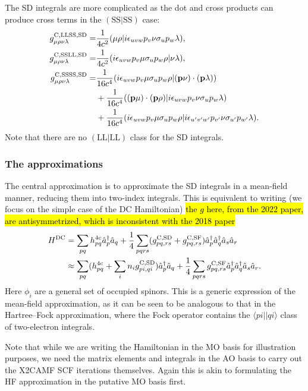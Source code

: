 \documentclass{article}
\begin{document}
The SD integrals are more complicated as the dot and cross products can produce cross terms in the $(\mathrm{SS}|\mathrm{SS})$ case:
\begin{align}
g^{\mathrm{C, LLSS, SD}}_{\mu\rho\nu\lambda}=&\frac{1}{4c^2}( \mu\rho|i\epsilon_{uvw}p_v\nu\sigma_up_w\lambda ),\label{eq:sd_ao_llss}\\
g^{\mathrm{C, SSLL, SD}}_{\mu\rho\nu\lambda}=&\frac{1}{4c^2}(i\epsilon_{uvw}p_v\mu\sigma_up_w\rho|\nu\lambda ),\label{eq:sd_ao_ssll}\\
g^{\mathrm{C, SSSS, SD}}_{\mu\rho\nu\lambda}=&\frac{1}{16c^4}(i\epsilon_{uvw}p_v\mu\sigma_up_w\rho|(\bm{\mathrm{p}}\nu)\cdot(\bm{\mathrm{p}}\lambda))\nonumber\\
&+\frac{1}{16c^4}((\bm{\mathrm{p}}\mu)\cdot(\bm{\mathrm{p}}\rho)|i\epsilon_{uvw}p_v\nu\sigma_up_w\lambda)\nonumber\\
&+\frac{1}{16c^4}(i\epsilon_{uvw}p_v\mu\sigma_up_w\rho|i\epsilon_{u'v'w'}p_{v'}\nu\sigma_{u'}p_{w'}\lambda).\label{eq:sd_ao_ssss}
\end{align}
Note that there are no $(\mathrm{LL}|\mathrm{LL})$ class for the SD integrals.

\subsubsection{The approximations}
The central approximation is to approximate the SD integrals in a mean-field manner, reducing them into two-index integrals. This is equivalent to writing (we focus on the simple case of the DC Hamiltonian) \hl{the $g$ here, from the 2022 paper, are antisymmetrized, which is inconsistent with the 2018 paper}
\begin{align}
H^{\mathrm{DC}}&=\sum_{pq}h_{pq}^{\mathrm{4c}}\hat{a}_p^{\dagger}\hat{a}_q+\frac{1}{4}\sum_{pqrs}(g_{pq,rs}^{\mathrm{C,SD}}+g_{pq,rs}^{\mathrm{C,SF}})\hat{a}_p^{\dagger}\hat{a}_q^{\dagger}\hat{a}_s\hat{a}_r\\
&\approx \sum_{pq}(h_{pq}^{\mathrm{4c}} +\sum_in_ig_{pi,qi}^{\mathrm{C,SD}})\hat{a}_p^{\dagger}\hat{a}_q+\frac{1}{4}\sum_{pqrs}g_{pq,rs}^{\mathrm{C,SF}}\hat{a}_p^{\dagger}\hat{a}_q^{\dagger}\hat{a}_s\hat{a}_r.
\end{align}
Here $\phi_i$ are a general set of occupied spinors. This is a generic expression of the mean-field approximation, as it can be seen to be analogous to that in the Hartree--Fock approximation, where the Fock operator contains the $\langle pi||qi\rangle$ class of two-electron integrals.

Note that while we are writing the Hamiltonian in the MO basis for illustration purposes, we need the matrix elements and integrals in the AO basis to carry out the X2CAMF SCF iterations themselves. Again this is akin to formulating the HF approximation in the putative MO basis first.
\end{document}
